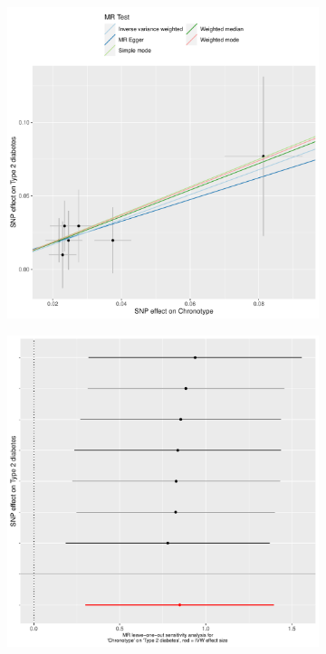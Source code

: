\documentclass[journal,article,submit,moreauthors,pdftex]{Definitions/mdpi}
\begin{document}
\begin{figure}[htbp]
\begin{subfigure}{.5\linewidth}
\centering
	\includegraphics[width=\linewidth]{Figs/Analysis2/Chronotype_vs_Type_2_diabetes.Scatterplots.pdf}
\caption{}
\label{t2dmScatter}
\end{subfigure}
\begin{subfigure}{.5\linewidth}
\centering
	\includegraphics[width=\linewidth,keepaspectratio]{Figs/Analysis2/Chronotype_vs_Type_2_diabetes.LOOplots.pdf}

\end{subfigure}
\end{figure}
\end{document}
